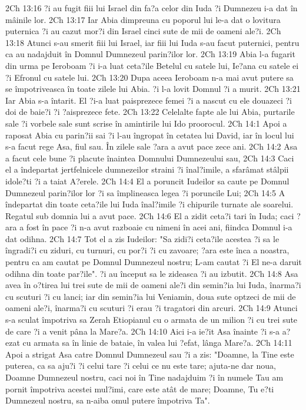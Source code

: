 2Ch 13:16  ?i au fugit fiii lui Israel din fa?a celor din Iuda ?i Dumnezeu i-a dat în mâinile lor.
2Ch 13:17  Iar Abia dimpreuna cu poporul lui le-a dat o lovitura puternica ?i au cazut mor?i din Israel cinci sute de mii de oameni ale?i.
2Ch 13:18  Atunci s-au smerit fiii lui Israel, iar fiii lui Iuda s-au facut puternici, pentru ca au nadajduit în Domnul Dumnezeul parin?ilor lor.
2Ch 13:19  Abia l-a fugarit din urma pe Ieroboam ?i i-a luat ceta?ile Betelul cu satele lui, Ie?ana cu satele ei ?i Efronul cu satele lui.
2Ch 13:20  Dupa aceea Ieroboam n-a mai avut putere sa se împotriveasca în toate zilele lui Abia. ?i l-a lovit Domnul ?i a murit.
2Ch 13:21  Iar Abia s-a întarit. El ?i-a luat paisprezece femei ?i a nascut cu ele douazeci ?i doi de baie?i ?i ?aisprezece fete.
2Ch 13:22  Celelalte fapte ale lui Abia, purtarile sale ?i vorbele sale sunt scrise în amintirile lui Ido proorocul.
2Ch 14:1  Apoi a raposat Abia cu parin?ii sai ?i l-au îngropat în cetatea lui David, iar în locul lui s-a facut rege Asa, fiul sau. În zilele sale ?ara a avut pace zece ani.
2Ch 14:2  Asa a facut cele bune ?i placute înaintea Domnului Dumnezeului sau,
2Ch 14:3  Caci el a îndepartat jertfelnicele dumnezeilor straini ?i înal?imile, a sfarâmat stâlpii idole?ti ?i a taiat A?erele.
2Ch 14:4  El a poruncit Iudeilor sa caute pe Domnul Dumnezeul parin?ilor lor ?i sa împlineasca legea ?i poruncile Lui;
2Ch 14:5  A îndepartat din toate ceta?ile lui Iuda înal?imile ?i chipurile turnate ale soarelui. Regatul sub domnia lui a avut pace.
2Ch 14:6  El a zidit ceta?i tari în Iuda; caci ?ara a fost în pace ?i n-a avut razboaie cu nimeni în acei ani, fiindca Domnul i-a dat odihna.
2Ch 14:7  Tot el a zis Iudeilor: "Sa zidi?i ceta?ile acestea ?i sa le îngradi?i cu ziduri, cu turnuri, cu por?i ?i cu zavoare; ?ara este înca a noastra, pentru ca am cautat pe Domnul Dumnezeul nostru; L-am cautat ?i El ne-a daruit odihna din toate par?ile". ?i au început sa le zideasca ?i au izbutit.
2Ch 14:8  Asa avea în o?tirea lui trei sute de mii de oameni ale?i din semin?ia lui Iuda, înarma?i cu scuturi ?i cu lanci; iar din semin?ia lui Veniamin, doua sute optzeci de mii de oameni ale?i, înarma?i cu scuturi ?i erau ?i tragatori din arcuri.
2Ch 14:9  Atunci s-a sculat împotriva sa Zerah Etiopianul cu o armata de un milion ?i cu trei sute de care ?i a venit pâna la Mare?a.
2Ch 14:10  Aici i-a ie?it Asa înainte ?i s-a a?ezat cu armata sa în linie de bataie, în valea lui ?efat, lânga Mare?a.
2Ch 14:11  Apoi a strigat Asa catre Domnul Dumnezeul sau ?i a zis: "Doamne, la Tine este puterea, ca sa aju?i ?i celui tare ?i celui ce nu este tare; ajuta-ne dar noua, Doamne Dumnezeul nostru, caci noi în Tine nadajduim ?i în numele Tau am pornit împotriva acestei mul?imi, care este atât de mare; Doamne, Tu e?ti Dumnezeul nostru, sa n-aiba omul putere împotriva Ta".
